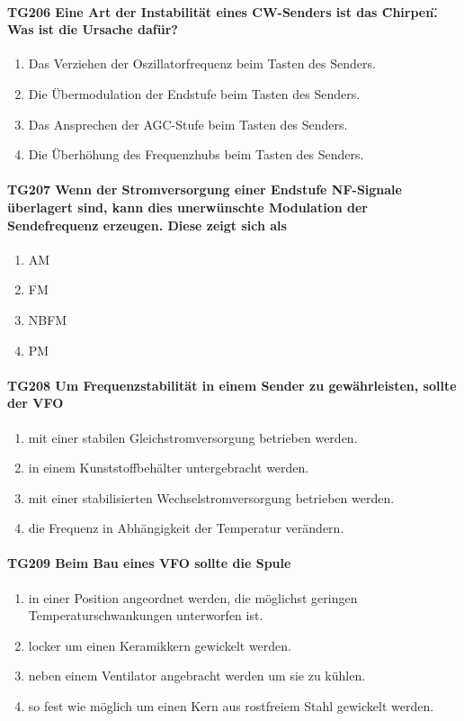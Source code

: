\documentclass[8pt]{article}
\begin{document}
\paragraph*{TG206 Eine Art der Instabilität eines CW-Senders ist das \"Chirpen\". Was ist die Ursache dafür?}
\begin{enumerate}[nolistsep,label=\Alph*]
\item Das Verziehen der Oszillatorfrequenz beim Tasten des Senders.
\item Die Übermodulation der Endstufe beim Tasten des Senders.
\item Das Ansprechen der AGC-Stufe beim Tasten des Senders.
\item Die Überhöhung des Frequenzhubs beim Tasten des Senders.
\end{enumerate}

\paragraph*{TG207 Wenn der Stromversorgung einer Endstufe NF-Signale überlagert sind, kann dies unerwünschte Modulation der Sendefrequenz erzeugen. Diese zeigt sich als} 
\begin{enumerate}[nolistsep,label=\Alph*]
\item AM
\item FM
\item NBFM
\item PM
\end{enumerate}

\paragraph*{TG208 Um Frequenzstabilität in einem Sender zu gewährleisten, sollte der VFO} 
\begin{enumerate}[nolistsep,label=\Alph*]
\item mit einer stabilen Gleichstromversorgung betrieben werden.
\item in einem Kunststoffbehälter untergebracht werden.
\item mit einer stabilisierten Wechselstromversorgung betrieben werden.
\item die Frequenz in Abhängigkeit der Temperatur verändern.
\end{enumerate}

\paragraph*{TG209 Beim Bau eines VFO sollte die Spule}
\begin{enumerate}[nolistsep,label=\Alph*]
\item in einer Position angeordnet werden, die möglichst geringen Temperaturschwankungen unterworfen ist.
\item locker um einen Keramikkern gewickelt werden.
\item neben einem Ventilator angebracht werden um sie zu kühlen.
\item so fest wie möglich um einen Kern aus rostfreiem Stahl gewickelt werden.
\end{enumerate}
\end{document}
